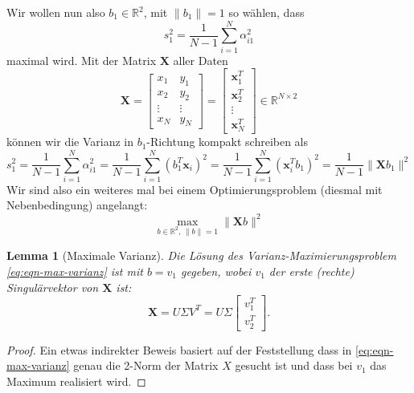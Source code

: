 \documentclass[
]{book}
\newtheorem{lemma}{Lemma}[chapter]
\theoremstyle{definition}
\theoremstyle{definition}
\theoremstyle{definition}
\theoremstyle{definition}
\theoremstyle{remark}
\begin{document}
Wir wollen nun also \(b_1\in \mathbb R^{2}\), mit \(\|b_1\|=1\) so wählen, dass
\begin{equation*}
s_1^2 = \frac{1}{N-1}\sum_{i=1}^N \alpha_{i1}^2
\end{equation*}
maximal wird. Mit der Matrix \(\mathbf X\) aller Daten
\begin{equation*}
\mathbf X = \begin{bmatrix}
x_1 & y_1 \\ x_2 & y_2 \\ \vdots & \vdots \\ x_N & y_N
\end{bmatrix} = 
\begin{bmatrix}
\mathbf x_1^T\\ \mathbf x_2^T  \\  \vdots \\ \mathbf x_N^T
\end{bmatrix} 
\in \mathbb R^{N\times 2}
\end{equation*}
können wir die Varianz in \(b_1\)-Richtung kompakt schreiben als
\begin{equation*}
s_1^2 = \frac{1}{N-1}\sum_{i=1}^N \alpha_{i1}^2
= \frac{1}{N-1}\sum_{i=1}^N (b_1^T\mathbf x_i)^2
= \frac{1}{N-1}\sum_{i=1}^N (\mathbf x_i^Tb_1)^2
= \frac{1}{N-1}\| \mathbf X b_1 \|^2
\end{equation*}
Wir sind also ein weiteres mal bei einem Optimierungsproblem (diesmal mit Nebenbedingung) angelangt:
\begin{equation}\label{eq:eqn-max-varianz}
\max_{b\in \mathbb R^{2},\, \|b\|=1} \|\mathbf X b\|^2
\end{equation}

\begin{lemma}[Maximale Varianz]
\protect\hypertarget{lem:varianz-maximization}{}\label{lem:varianz-maximization}Die Lösung des Varianz-Maximierungsproblem \eqref{eq:eqn-max-varianz} ist mit \(b=v_1\) gegeben, wobei \(v_1\) der erste (rechte) Singulärvektor von \(\mathbf X\) ist:
\begin{equation*}
\mathbf X = U \Sigma V^T = U \Sigma \begin{bmatrix}
v_1^T \\ v_2^T
\end{bmatrix}.
\end{equation*}
\end{lemma}

\begin{proof}
Ein etwas indirekter Beweis basiert auf der Feststellung dass in
\eqref{eq:eqn-max-varianz} genau die 2-Norm der Matrix \(X\) gesucht ist und dass
bei \(v_1\) das Maximum realisiert wird.
\end{proof}
\end{document}
